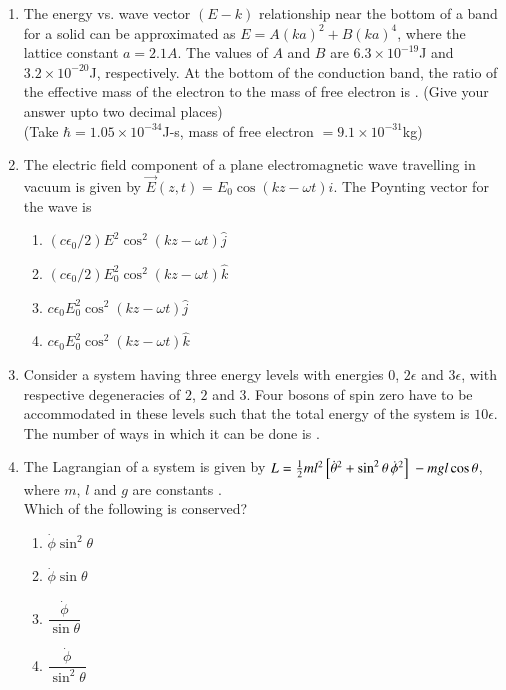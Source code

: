 \documentclass[journal,12pt,onecolumn]{IEEEtran}
\theoremstyle{remark}
\begin{document}
\begin{enumerate}
\item The energy vs. wave vector $(E - k)$ relationship near the bottom of a band for a solid can be approximated as $E = A (ka)^2 + B (ka)^4$, where the lattice constant $a = 2.1A$. The values of $A$ and $B$ are $6.3 \times 10^{-19}$J and $3.2 \times 10^{-20}$J, respectively. At the bottom of the conduction band, the ratio of the effective mass of the electron to the mass of free electron is \underline{\hspace{2cm}}. (Give your answer upto two decimal places)\\
(Take $\hbar = 1.05 \times 10^{-34}$J-s, mass of free electron $= 9.1 \times 10^{-31}$kg)

\item The electric field component of a plane electromagnetic wave travelling in vacuum is given by $\vec{E}(z, t) = E_0 \cos(kz - \omega t) \hat{i}$. The Poynting vector for the wave is


\begin{enumerate}
    \item $(c \epsilon_0  /2)E^2 \cos^2 (kz - \omega t) \hat{j}$
    \item $(c \epsilon_0  /2)E_0^2 \cos^2 (kz - \omega t) \hat{k}$
    \item $c \epsilon_0 E_0^2 \cos^2 (kz - \omega t) \hat{j}$
    \item $c \epsilon_0 E_0^2 \cos^2 (kz - \omega t) \hat{k}$
\end{enumerate}

    \item Consider a system having three energy levels with energies $0$, $2\epsilon$ and $3\epsilon$, with respective degeneracies of $2$, $2$ and $3$. Four bosons of spin zero have to be accommodated in these levels such that the total energy of the system is $10\epsilon$. The number of ways in which it can be done is \underline{\hspace{2cm}}.
    \newpage
    \item The Lagrangian of a system is given by
    $
L = \frac{1}{2} m l^2 {}\left[\dot{\theta}^2 + \sin^2 \theta\, \dot{\phi}^2 \right]\ - mgl \cos \theta $, where $m$, $l$ and $g$ are constants .\\
    Which of the following is conserved?
    \begin{multicols}{4}
    \begin{enumerate}
        \item $\dot{\phi}\sin^2 \theta$
        \item $\dot{\phi}\sin \theta$
        \item $\dfrac{\dot{\phi}}{\sin\theta}$
        \item $\dfrac{\dot{\phi}}{\sin^2\theta}$
    \end{enumerate}
    \end{multicols}
    

\end{enumerate}
\end{document}
